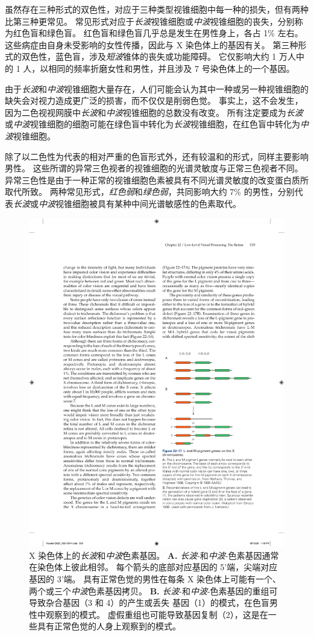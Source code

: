 虽然存在三种形式的双色性，对应于三种类型视锥细胞中每一种的损失，但有两种比第三种更常见。
常见形式对应于\textit{长波}视锥细胞或\textit{中波}视锥细胞的丧失，分别称为红色盲和绿色盲。
红色盲和绿色盲几乎总是发生在男性身上，各占 1\% 左右。
这些病症由自身未受影响的女性传播，因此与 X 染色体上的基因有关。
第三种形式的双色性，蓝色盲，涉及\textit{短波}锥体的丧失或功能障碍。
它仅影响大约 1 万人中的 1 人，以相同的频率折磨女性和男性，并且涉及 7 号染色体上的一个基因。


由于\textit{长波}和\textit{中波}视锥细胞大量存在，人们可能会认为其中一种或另一种视锥细胞的缺失会对视力造成更广泛的损害，而不仅仅是削弱色觉。
事实上，这不会发生，因为二色视视网膜中\textit{长波}和\textit{中波}视锥细胞的总数没有改变。
所有注定要成为\textit{长波}或\textit{中波}视锥细胞的细胞可能在绿色盲中转化为\textit{长波}视锥细胞，在红色盲中转化为\textit{中波}视锥细胞。


除了以二色性为代表的相对严重的色盲形式外，还有较温和的形式，同样主要影响男性。
这些所谓的异常三色视者的视锥细胞的光谱灵敏度与正常三色视者不同。
异常三色性是由于一种正常的视锥细胞色素被具有不同光谱灵敏度的改变蛋白质所取代所致。
两种常见形式，\textit{红色弱}和\textit{绿色弱}，共同影响大约 7\% 的男性，分别代表\textit{长波}或\textit{中波}视锥细胞被具有某种中间光谱敏感性的色素取代。


\begin{figure}[htbp]
	\centering
	\includegraphics[width=0.6\linewidth]{chap22/fig_22_17}
	\caption{X 染色体上的\textit{长波}和\textit{中波}色素基因。 
		\textbf{A.} \textit{长波}-和\textit{中波}-色素基因通常在染色体上彼此相邻。
		每个箭头的底部对应基因的 5'端，尖端对应基因的 3'端。 
		具有正常色觉的男性在每条 X 染色体上可能有一个、两个或三个\textit{中波}色素基因拷贝\cite{nathans1986molecular}。
		\textbf{B.} \textit{长波}-和\textit{中波}-色素基因的重组可导致杂合基因（3 和 4）的产生或丢失 基因（1）的模式，在色盲男性中观察到的模式。 
		虚假重组也可能导致基因复制（2），这是在一些具有正常色觉的人身上观察到的模式。}
	\label{fig:22_17}
\end{figure}


